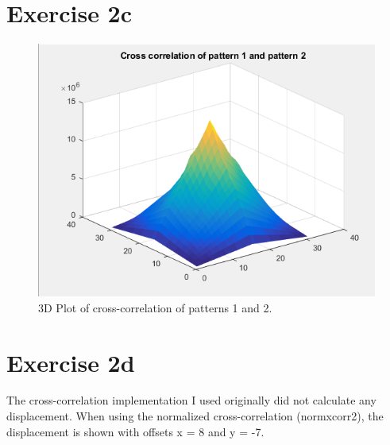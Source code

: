 \documentclass[12pt, a4paper]{article}
\begin{document}
	\part*{Exercise 2c}
	\begin{figure}[bp!]
		\caption{3D Plot of cross-correlation of patterns 1 and 2.}
		\centering
		\includegraphics[width=\textwidth]{pictures/2c_pattern1xpattern2}
	\end{figure}
	\newpage
	\part*{Exercise 2d}
	The cross-correlation implementation I used originally did not calculate any displacement. When using the normalized cross-correlation (normxcorr2), the displacement is shown with offsets x = 8 and y = -7.	
\end{document}
